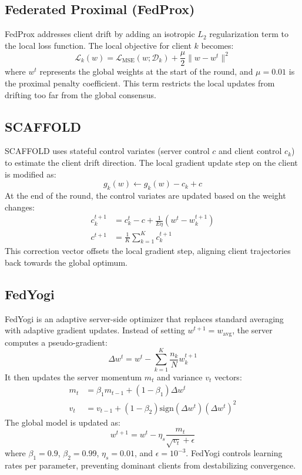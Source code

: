 \subsection{Federated Proximal (FedProx)}
FedProx addresses client drift by adding an isotropic $L_2$ regularization term to the local loss function. The local objective for client $k$ becomes:
\begin{equation}
    \mathcal{L}_k(w) = \mathcal{L}_{\text{MSE}}(w; \mathcal{D}_k) + \frac{\mu}{2} \|w - w^t\|^2
\end{equation}
where $w^t$ represents the global weights at the start of the round, and $\mu = 0.01$ is the proximal penalty coefficient. This term restricts the local updates from drifting too far from the global consensus.

\subsection{SCAFFOLD}
SCAFFOLD uses stateful control variates (server control $c$ and client control $c_k$) to estimate the client drift direction. The local gradient update step on the client is modified as:
\begin{equation}
    g_k(w) \leftarrow g_k(w) - c_k + c
\end{equation}
At the end of the round, the control variates are updated based on the weight changes:
\begin{align}
    c_k^{t+1} &= c_k^t - c + \frac{1}{E \eta} (w^t - w_k^{t+1}) \\
    c^{t+1} &= \frac{1}{K} \sum_{k=1}^K c_k^{t+1}
\end{align}
This correction vector offsets the local gradient step, aligning client trajectories back towards the global optimum.

\subsection{FedYogi}
FedYogi is an adaptive server-side optimizer that replaces standard averaging with adaptive gradient updates. Instead of setting $w^{t+1} = w_{\text{avg}}$, the server computes a pseudo-gradient:
\begin{equation}
    \Delta w^t = w^t - \sum_{k=1}^K \frac{n_k}{N} w_k^{t+1}
\end{equation}
It then updates the server momentum $m_t$ and variance $v_t$ vectors:
\begin{align}
    m_t &= \beta_1 m_{t-1} + (1 - \beta_1) \Delta w^t \\
    v_t &= v_{t-1} + (1 - \beta_2) \text{sign}(\Delta w^t) (\Delta w^t)^2
\end{align}
The global model is updated as:
\begin{equation}
    w^{t+1} = w^t - \eta_s \frac{m_t}{\sqrt{v_t} + \epsilon}
\end{equation}
where $\beta_1 = 0.9$, $\beta_2 = 0.99$, $\eta_s = 0.01$, and $\epsilon = 10^{-3}$. FedYogi controls learning rates per parameter, preventing dominant clients from destabilizing convergence.

